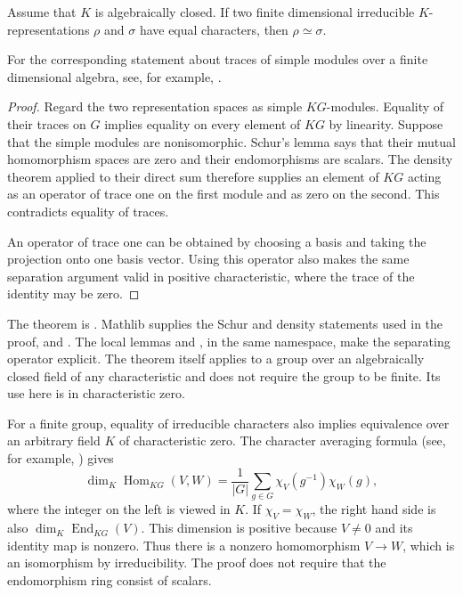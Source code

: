 \begin{proposition}
\label{lib:ordinary:separation}
Assume that $K$ is algebraically closed. If two finite dimensional
irreducible $K$-representations $\rho$ and $\sigma$ have equal characters,
then $\rho\simeq\sigma$.
\end{proposition}
For the corresponding statement about traces of simple modules over a
finite dimensional algebra, see, for example,
\cite[Theorem~1.19]{Navarro1998}.
\begin{proof}
Regard the two representation spaces as simple $KG$-modules. Equality of
their traces on $G$ implies equality on every element of $KG$ by linearity.
Suppose that the simple modules are nonisomorphic. Schur's lemma says that
their mutual homomorphism spaces are zero and their endomorphisms are
scalars. The density theorem applied to their direct sum therefore supplies
an element of $KG$ acting as an operator of trace one on the first module
and as zero on the second. This contradicts equality of traces.

An operator of trace one can be obtained by choosing a basis and taking the
projection onto one basis vector. Using this operator also makes the same
separation argument valid in positive characteristic, where the trace of
the identity may be zero.
\end{proof}

\begin{implementation}
The theorem is
.
Mathlib supplies the Schur and density statements used in the proof,
 and
.
The local lemmas
 and
, in the same namespace, make the
separating operator explicit. The theorem itself applies to a group over
an algebraically closed field of any characteristic and does not require
the group to be finite. Its use here is in characteristic zero.
\end{implementation}

For a finite group, equality of irreducible characters also implies
equivalence over an arbitrary field $K$ of characteristic zero. The
character averaging formula (see, for example,
\cite[Section~12.1, proof of Proposition~32]{Serre1977}) gives
\[
 \dim_K\operatorname{Hom}_{KG}(V,W)
   =\frac{1}{|G|}\sum_{g\in G}\chi_V(g^{-1})\chi_W(g),
\]
where the integer on the left is viewed in $K$. If $\chi_V=\chi_W$,
the right hand side is also $\dim_K\operatorname{End}_{KG}(V)$.
This dimension is positive because $V\ne0$ and its identity map is
nonzero. Thus there is a nonzero homomorphism $V\to W$, which is an
isomorphism by irreducibility. The proof does not require that the
endomorphism ring consist of scalars.

